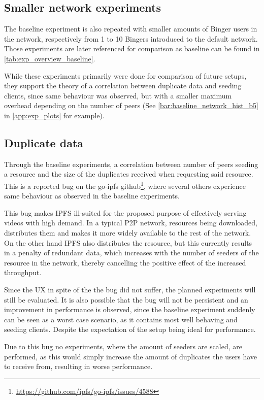 \subsection{Smaller network experiments}
The baseline experiment is also repeated with smaller amounts of Binger users in the network, respectively from 1 to 10 Bingers introduced to the default network. Those experiments are later referenced for comparison as baseline can be found in \autoref{tab:exp_overview_baseline}.

While these experiments primarily were done for comparison of future setups, they support the theory of a correlation between duplicate data and seeding clients, since same behaviour was observed, but with a smaller maximum overhead depending on the number of peers (See \autoref{bar:baseline_network_hist_b5} in \autoref{app:exp_plots} for example).

\subsection{Duplicate data}
\label{sec:eval_bug_dup}
Through the baseline experiments, a correlation between number of peers seeding a resource and the size of the duplicates received when requesting said resource. This is a reported bug on the go-ipfs github\footnote{\url{https://github.com/ipfs/go-ipfs/issues/4588}}, where several others experience same behaviour as observed in the baseline experiments.

This bug makes \ac{IPFS} ill-suited for the proposed purpose of effectively serving videos with high demand. In a typical \ac{P2P} network, resources being downloaded, distributes them and makes it more widely available to the rest of the network. On the other hand \ac{IPFS} also distributes the resource, but this currently results in a penalty of redundant data, which increases with the number of seeders of the resource in the network, thereby cancelling the positive effect of the increased throughput.

Since the \ac{UX} in spite of the the bug did not suffer, the planned experiments will still be evaluated. It is also possible that the bug will not be persistent and an improvement in performance is observed, since the baseline experiment suddenly can be seen as a worst case scenario, as it contains most well behaving and seeding clients. Despite the expectation of the setup being ideal for performance.

Due to this bug no experiments, where the amount of seeders are scaled, are performed, as this would simply increase the amount of duplicates the users have to receive from, resulting in worse performance.


